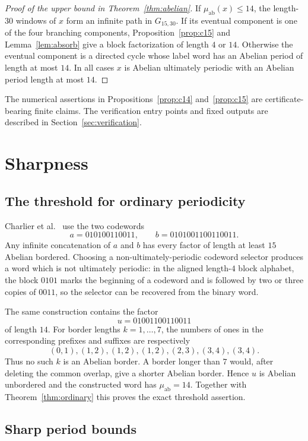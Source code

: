\documentclass[11pt]{article}
\begin{document}
\begin{proof}[Proof of the upper bound in Theorem~\ref{thm:abelian}]
If $\mu_{\mathrm{ab}}(x)\le14$, the length-$30$ windows of $x$ form an
infinite path in $G_{15,30}$. If its eventual component is one of the four
branching components, Proposition~\ref{prop:c15} and Lemma~\ref{lem:absorb}
give a block factorization of length $4$ or $14$. Otherwise the eventual
component is a directed cycle whose label word has an Abelian period of
length at most $14$. In all cases $x$ is Abelian ultimately periodic with an
Abelian period length at most $14$.
\end{proof}

The numerical assertions in Propositions~\ref{prop:c14} and~\ref{prop:c15}
are certificate-bearing finite claims. The verification entry points and
fixed outputs are described in Section~\ref{sec:verification}.

\section{Sharpness}

\subsection{The threshold for ordinary periodicity}

Charlier et al.~\cite[Proposition~2 and Remark~2]{CHPZ} use the two codewords
\[
a=010100110011,
\qquad b=0101001100110011.
\]
Any infinite concatenation of $a$ and $b$ has every factor of length at least
$15$ Abelian bordered. Choosing a non-ultimately-periodic codeword selector
produces a word which is not ultimately periodic: in the aligned length-$4$
block alphabet, the block $0101$ marks the beginning of a codeword and is
followed by two or three copies of $0011$, so the selector can be recovered
from the binary word.

The same construction contains the factor
\[
u=01001100110011
\]
of length $14$. For border lengths $k=1,\ldots,7$, the numbers of ones in the
corresponding prefixes and suffixes are respectively
\[
(0,1),(1,2),(1,2),(1,2),(2,3),(3,4),(3,4).
\]
Thus no such $k$ is an Abelian border. A border longer than $7$ would, after
deleting the common overlap, give a shorter Abelian border. Hence $u$ is
Abelian unbordered and the constructed word has $\mu_{\mathrm{ab}}=14$.
Together with Theorem~\ref{thm:ordinary} this proves the exact threshold
assertion.

\subsection{Sharp period bounds}
\end{document}
